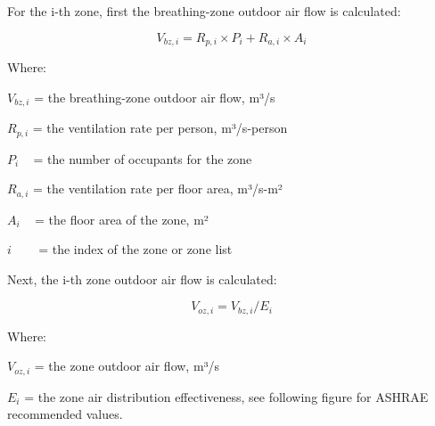 For the i-th zone, first the breathing-zone outdoor air flow is calculated:

\begin{equation}
{V_{bz,i}} = {R_{p,i}} \times {P_i} + {R_{a,i}} \times {A_i}
\end{equation}

Where:

\({V_{bz,i}}\) = the breathing-zone outdoor air flow, m³/s

\({R_{p,i}}\) = the ventilation rate per person, m³/s-person

\({P_i}\) ~ = the number of occupants for the zone

\({R_{a,i}}\) = the ventilation rate per floor area, m³/s-m²

\({A_i}\) ~ = the floor area of the zone, m²

\(i\) ~~~ = the index of the zone or zone list

Next, the i-th zone outdoor air flow is calculated:

\begin{equation}
{V_{oz,i}} = {V_{bz,i}}/{E_i}
\end{equation}

Where:

\({V_{oz,i}}\) = the zone outdoor air flow, m³/s

\({E_i}\) = the zone air distribution effectiveness, see following figure for ASHRAE recommended values.

